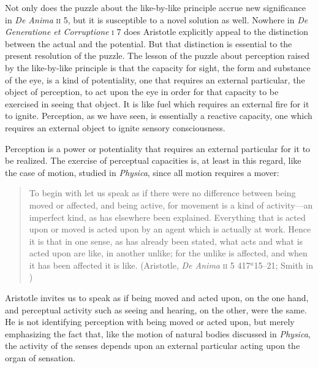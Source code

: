 Not only does the puzzle about the like-by-like principle accrue new significance in \emph{De Anima} \textsc{ii} 5, but it is susceptible to a novel solution as well. Nowhere in \emph{De Generatione et Corruptione} \textsc{i} 7 does Aristotle explicitly appeal to the distinction between the actual and the potential. But that distinction is essential to the present resolution of the puzzle. The lesson of the puzzle about perception raised by the like-by-like principle is that the capacity for sight, the form and substance of the eye, is a kind of potentiality, one that requires an external particular, the object of perception, to act upon the eye in order for that capacity to be exercised in seeing that object. It is like fuel which requires an external fire for it to ignite. Perception, as we have seen, is essentially a reactive capacity, one which requires an external object to ignite sensory consciousness.

Perception is a power or potentiality that requires an external particular for it to be realized. The exercise of perceptual capacities is, at least in this regard, like the case of motion, studied in \emph{Physica}, since all motion requires a mover:
\begin{quote}
	To begin with let us speak as if there were no difference between being moved or affected, and being active, for movement is a kind of activity---an imperfect kind, as has elsewhere been explained. Everything that is acted upon or moved is acted upon by an agent which is actually at work. Hence it is that in one sense, as has already been stated, what acts and what is acted upon are like, in another unlike; for the unlike is affected, and when it has been affected it is like. (Aristotle, \emph{De Anima} \textsc{ii} 5 417\( ^{a} \)15--21; Smith in \citealt[30]{Barnes:1984uq})
\end{quote}
Aristotle invites us to speak as if being moved and acted upon, on the one hand, and perceptual activity such as seeing and hearing, on the other, were the same. He is not identifying perception with being moved or acted upon, but merely emphasizing the fact that, like the motion of natural bodies discussed in \emph{Physica}, the activity of the senses depends upon an external particular acting upon the organ of sensation.

